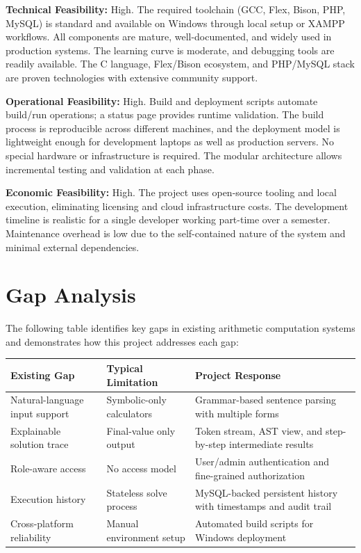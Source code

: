 \documentclass[12pt,a4paper]{report}
\begin{document}
\textbf{Technical Feasibility:} High. The required toolchain (GCC, Flex, Bison, PHP, MySQL)
is standard and available on Windows through local setup or XAMPP workflows. All components are mature, well-documented,
and widely used in production systems. The learning curve is moderate, and debugging tools are readily available.
The C language, Flex/Bison ecosystem, and PHP/MySQL stack are proven technologies with extensive community support.

\vspace{3pt}
\textbf{Operational Feasibility:} High. Build and deployment scripts automate build/run operations; a status page provides
runtime validation. The build process is reproducible across different machines, and the deployment model is lightweight
enough for development laptops as well as production servers. No special hardware or infrastructure is required.
The modular architecture allows incremental testing and validation at each phase.

\vspace{3pt}
\textbf{Economic Feasibility:} High. The project uses open-source tooling and local execution, eliminating licensing and
cloud infrastructure costs. The development timeline is realistic for a single developer working part-time over a semester.
Maintenance overhead is low due to the self-contained nature of the system and minimal external dependencies.

\section{Gap Analysis}

The following table identifies key gaps in existing arithmetic computation systems and demonstrates how this project addresses each gap:

\begin{longtable}{L{0.32\textwidth} L{0.3\textwidth} L{0.32\textwidth}}
\toprule
Existing Gap & Typical Limitation & Project Response \\
\midrule
Natural-language input support & Symbolic-only calculators & Grammar-based sentence parsing with multiple forms \\
Explainable solution trace & Final-value only output & Token stream, AST view, and step-by-step intermediate results \\
Role-aware access & No access model & User/admin authentication and fine-grained authorization \\
Execution history & Stateless solve process & MySQL-backed persistent history with timestamps and audit trail \\
Cross-platform reliability & Manual environment setup & Automated build scripts for Windows deployment \\
\bottomrule
\end{longtable}
\end{document}
